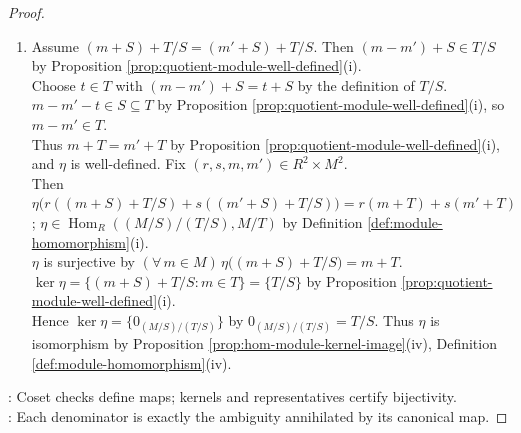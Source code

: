 \begin{theorem}
\begin{proof}
\begin{enumerate}[label=(\roman*)]
Thus $s+T=s'+T$ by Proposition \ref{prop:quotient-module-well-defined}(i), so $\theta$ is well-defined. Fix $(r,q,s_1,s_2)\in R^2\times S^2$.\\
Then $\theta\bigl(r(s_1+(S\cap T))+q(s_2+(S\cap T))\bigr)=r(s_1+T)+q(s_2+T)$. Hence $\theta\in\operatorname{Hom}_R(S/(S\cap T),(S+T)/T)$ by Definition \ref{def:module-homomorphism}(i).\\
Fix $x\in(S+T)/T$, $y\in S+T$ with $x=y+T$ by Definition \ref{def:quotient-module}. Choose $(s,t)\in S\times T$ with $y=s+t$ by Proposition \ref{prop:submodule-intersection-sum}(ii).\\
Then $x=s+T=\theta\bigl(s+(S\cap T)\bigr)$, so $\theta$ is surjective. $\ker\theta=\{s+(S\cap T):s\in S\cap T\}=\{S\cap T\}$ by Proposition \ref{prop:quotient-module-well-defined}(i).\\
Hence $\ker\theta=\{0_{S/(S\cap T)}\}$ by $0_{S/(S\cap T)}=S\cap T$. Thus $\theta$ is an isomorphism by Proposition \ref{prop:hom-module-kernel-image}(iv) and Definition \ref{def:module-homomorphism}(iv).
\item Assume $(m+S)+T/S=(m'+S)+T/S$. Then $(m-m')+S\in T/S$ by Proposition \ref{prop:quotient-module-well-defined}(i).\\
Choose $t\in T$ with $(m-m')+S=t+S$ by the definition of $T/S$. $m-m'-t\in S\subseteq T$ by Proposition \ref{prop:quotient-module-well-defined}(i), so $m-m'\in T$.\\
Thus $m+T=m'+T$ by Proposition \ref{prop:quotient-module-well-defined}(i), and $\eta$ is well-defined. Fix $(r,s,m,m')\in R^2\times M^2$.\\
Then $\eta\bigl(r((m+S)+T/S)+s((m'+S)+T/S)\bigr)=r(m+T)+s(m'+T)$; $\eta\in\operatorname{Hom}_R((M/S)/(T/S),M/T)$ by Definition \ref{def:module-homomorphism}(i).\\
$\eta$ is surjective by $(\forall\,m\in M)\,\eta\bigl((m+S)+T/S\bigr)=m+T$. $\ker\eta=\{(m+S)+T/S:m\in T\}=\{T/S\}$ by Proposition \ref{prop:quotient-module-well-defined}(i).\\
Hence $\ker\eta=\{0_{(M/S)/(T/S)}\}$ by $0_{(M/S)/(T/S)}=T/S$. Thus $\eta$ is isomorphism by Proposition \ref{prop:hom-module-kernel-image}(iv), Definition \ref{def:module-homomorphism}(iv).
\end{enumerate}
: Coset checks define maps; kernels and representatives certify bijectivity.\\
: Each denominator is exactly the ambiguity annihilated by its canonical map.
\end{proof}
\end{theorem}
